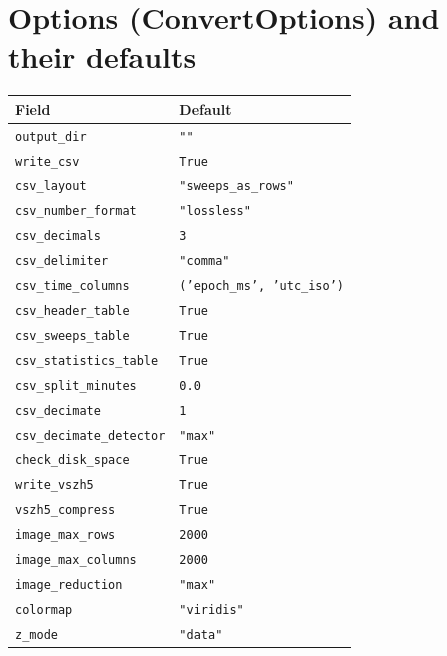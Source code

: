 \documentclass[11pt,a4paper]{article}
\begin{document}
\section{Options (ConvertOptions) and their defaults}
\begin{longtable}{p{5.6cm}p{9.6cm}}
\toprule
\textbf{Field} & \textbf{Default}\\
\midrule
\endhead
\texttt{output\_\allowbreak{}dir} & \texttt{""}\\
\texttt{write\_\allowbreak{}csv} & \texttt{True}\\
\texttt{csv\_\allowbreak{}layout} & \texttt{"sweeps\_\allowbreak{}as\_\allowbreak{}rows"}\\
\texttt{csv\_\allowbreak{}number\_\allowbreak{}format} & \texttt{"lossless"}\\
\texttt{csv\_\allowbreak{}decimals} & \texttt{3}\\
\texttt{csv\_\allowbreak{}delimiter} & \texttt{"comma"}\\
\texttt{csv\_\allowbreak{}time\_\allowbreak{}columns} & \texttt{('epoch\_\allowbreak{}ms', 'utc\_\allowbreak{}iso')}\\
\texttt{csv\_\allowbreak{}header\_\allowbreak{}table} & \texttt{True}\\
\texttt{csv\_\allowbreak{}sweeps\_\allowbreak{}table} & \texttt{True}\\
\texttt{csv\_\allowbreak{}statistics\_\allowbreak{}table} & \texttt{True}\\
\texttt{csv\_\allowbreak{}split\_\allowbreak{}minutes} & \texttt{0.0}\\
\texttt{csv\_\allowbreak{}decimate} & \texttt{1}\\
\texttt{csv\_\allowbreak{}decimate\_\allowbreak{}detector} & \texttt{"max"}\\
\texttt{check\_\allowbreak{}disk\_\allowbreak{}space} & \texttt{True}\\
\texttt{write\_\allowbreak{}vszh5} & \texttt{True}\\
\texttt{vszh5\_\allowbreak{}compress} & \texttt{True}\\
\texttt{image\_\allowbreak{}max\_\allowbreak{}rows} & \texttt{2000}\\
\texttt{image\_\allowbreak{}max\_\allowbreak{}columns} & \texttt{2000}\\
\texttt{image\_\allowbreak{}reduction} & \texttt{"max"}\\
\texttt{colormap} & \texttt{"viridis"}\\
\texttt{z\_\allowbreak{}mode} & \texttt{"data"}\\

\end{longtable}
\end{document}
